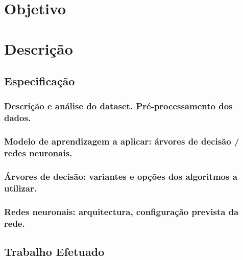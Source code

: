 \documentclass[a4paper]{article}
\begin{document}
\tableofcontents

\newpage


\section{Objetivo}

\newpage


\section{Descrição}

\subsection{Especificação}

\subsubsection{Descrição e análise do dataset. Pré-processamento dos dados.}

\subsubsection{Modelo de aprendizagem a aplicar: árvores de decisão / redes neuronais.}

\subsubsection{Árvores de decisão: variantes e opções dos algoritmos a utilizar.}

\subsubsection{Redes neuronais: arquitectura, configuração prevista da rede.}


\subsection{Trabalho Efetuado}
\end{document}
